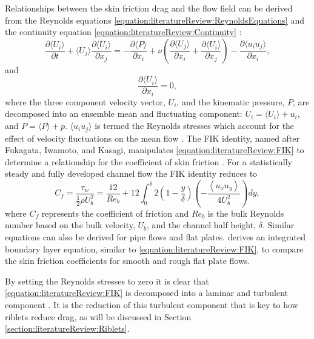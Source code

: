 \documentclass[12pt,oneside,a4paper]{article}
\newcommand{\pdev}[2]{\frac{\partial {#1}}{\partial {#2}}}
\begin{document}
Relationships between the skin friction drag and the flow field can be derived from the Reynolds equations \eqref{equation:literatureReview:ReynoldsEquations} and the continuity equation \eqref{equation:literatureReview:Continuity} \citep{pope2001}:
\begin{equation}
\pdev{\langle U_i \rangle}{t} + \langle U_j \rangle \pdev{\langle U_i \rangle}{x_j}
=
-\pdev{\langle P \rangle}{x_i}
+
\nu
	\left(
	\pdev{\langle U_j \rangle}{x_i}
	+
	\pdev{\langle U_i \rangle}{x_j} 
	\right)
-
\pdev{\langle u_i u_j\rangle}{x_i},
\label{equation:literatureReview:ReynoldsEquations}
\end{equation}
and 
\begin{equation}
\pdev{\langle U_i \rangle}{x_i}
=
0,
\label{equation:literatureReview:Continuity}
\end{equation}
where the three component velocity vector, $U_i$, and the kinematic pressure, $P$, are decomposed into an ensemble mean and fluctuating component: $U_i = \langle U_i \rangle + u_i$, and $P = \langle P \rangle + p$. $\langle u_i u_j \rangle$ is termed the Reynolds stresses which account for the effect of velocity fluctuations on the mean flow \citep{pope2001}. The FIK identity, named after Fukagata, Iwamoto, and Kasagi, manipulates \eqref{equation:literatureReview:FIK} to determine a relationship for the coefficient of skin friction \citep{fukagata2002}. For a statistically steady and fully developed channel flow the FIK identity reduces to
\begin{equation}
\label{equation:literatureReview:FIK}
C_f = \frac{\tau_w}{\frac{1}{2} \rho U_b^2} = \frac{12}{Re_b} + 12 \int_0^\delta 2 \left(1 - \frac{y}{\delta} \right)\left( - \frac{\left< u_x u_y \right> }{4 U_b^2} \right) dy,
\end{equation}
where $C_f$ represents the coefficient of friction and $Re_b$ is the bulk Reynolds number based on the bulk velocity, $U_b$, and the channel half height, $\delta$. Similar equations can also be derived for pipe flows and flat plates. \cite{newhall2006} derives an integrated boundary layer equation, similar to \eqref{equation:literatureReview:FIK}, to compare the skin friction coefficients for smooth and rough flat plate flows. 

By setting the Reynolds stresses to zero it is clear that \eqref{equation:literatureReview:FIK} is decomposed into a laminar and turbulent component \citep{kasagi2006}. It is the reduction of this turbulent component that is key to how riblets reduce drag, as will be discussed in Section \ref{section:literatureReview:Riblets}.
\end{document}
